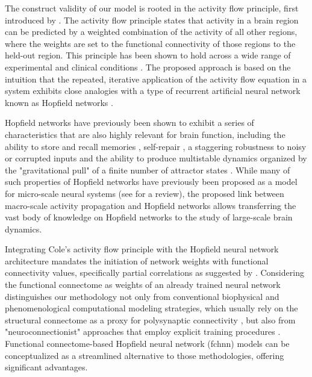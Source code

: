 \documentclass{article}
\begin{document}
The construct validity of our model is rooted in the activity flow principle, first introduced by
\citet{cole2016activity}. The activity flow principle states that activity in a brain region can be predicted by a weighted combination of the activity of all other regions, where the weights are set to the functional connectivity of those regions to the held-out region. This principle has been shown to hold across a wide range of experimental and clinical conditions
\citep{cole2016activity, ito2017cognitive, mill2022network, hearne2021activity, chen2018human}.
The proposed approach is based on the intuition that the repeated, iterative application of the activity flow equation in a system exhibits close analogies with a type of recurrent artificial neural network known as Hopfield networks \citep{hopfield1982neural}.

Hopfield networks have previously been shown to exhibit a series of characteristics that are also highly relevant for
brain function, including the ability to store and recall memories \citep{hopfield1982neural}, self-repair \citep{murre2003selfreparing},
a staggering robustness to noisy or corrupted inputs \citep{hertz1991introduction} and the ability to produce
multistable dynamics organized by the "gravitational pull" of a finite number of attractor states
\citep{khona2022attractor}. While many of such properties of Hopfield networks have previously been proposed as a model for micro-scale neural systems (see \cite{khona2022attractor} for a review), the proposed link between macro-scale activity propagation and Hopfield networks allows transferring the vast body of knowledge on Hopfield networks to the study of large-scale brain dynamics.

Integrating Cole's activity flow principle with the Hopfield neural network architecture mandates the initiation of network weights with functional connectivity values, specifically partial correlations as suggested by \citet{cole2016activity}.
Considering the functional connectome as weights of an already trained neural network distinguishes our methodology not only from conventional biophysical and phenomenological computational modeling strategies, which usually rely on the structural connectome as a proxy for polysynaptic connectivity \citep{cabral2017functional}, but also from "neuroconnectionist" approaches that employ explicit training procedures \citep{doerig2023neuroconnectionist}.
Functional connectome-based Hopfield neural network (\acrshort{fchnn}) models can be conceptualized as a streamlined alternative to those methodologies, offering significant advantages.
\end{document}

